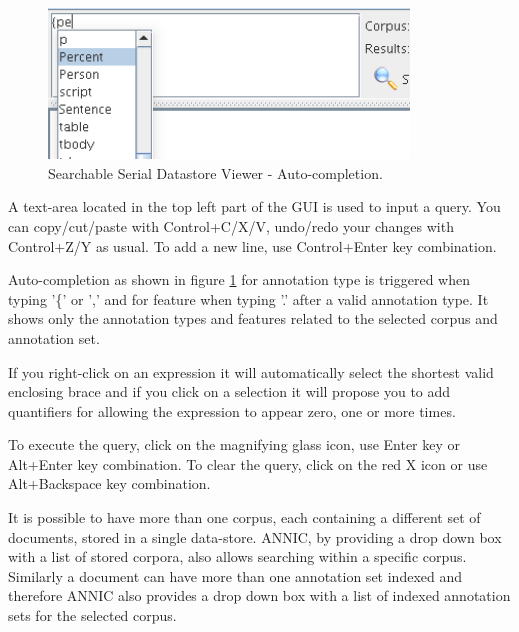 \begin{figure}
\begin{center}
\includegraphics[height=4cm]{ssd-auto-completion.png}
\caption{Searchable Serial Datastore Viewer - Auto-completion.}
\label{fig:annic-auto-completion}
\end{center}
\end{figure}


A text-area located in the top left part of the GUI is used to input a
query. You can copy/cut/paste with Control+C/X/V, undo/redo your
changes with Control+Z/Y as usual. To add a new line, use
Control+Enter key combination.

Auto-completion as shown in figure \ref{fig:annic-auto-completion}
for annotation type is triggered when typing '\{' or ',' and for feature when
typing '.' after a valid annotation type. It shows only the annotation
types and features related to the selected corpus and annotation
set.

If you right-click on an expression it will automatically select the
shortest valid enclosing brace and if you click on a selection it will
propose you to add quantifiers for allowing the expression to appear zero,
one or more times.

To execute the query, click on the magnifying glass icon, use Enter key or
Alt+Enter key combination. To clear the query, click on the red X icon or
use Alt+Backspace key combination.

It is possible to have more than one corpus, each containing a
different set of documents, stored in a single data-store. ANNIC, by
providing a drop down box with a list of stored corpora, also allows
searching within a specific corpus. Similarly a document
can have more than one annotation set indexed and therefore ANNIC also
provides a drop down box with a list of indexed annotation sets for
the selected corpus.

